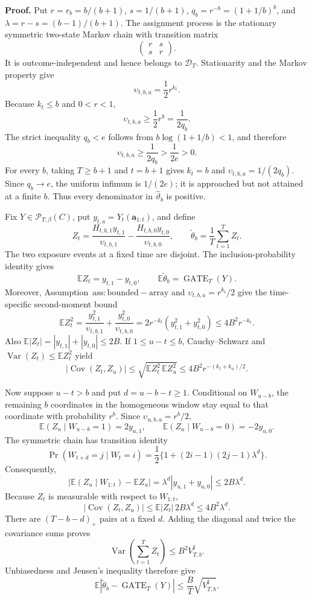 \textbf{Proof.} Put \(r=r_b=b/(b+1)\), \(s=1/(b+1)\), \(q_b=r^{-b}=(1+1/b)^b\), and \(\lambda=r-s=(b-1)/(b+1)\). The assignment process is the stationary symmetric two-state Markov chain with transition matrix
\[
\begin{pmatrix}r&s\\s&r\end{pmatrix}.
\]
It is outcome-independent and hence belongs to \(\mathcal D_T\). Stationarity and the Markov property give
\[
\upsilon_{t,b,a}=\frac12r^{k_t}.
\]
Because \(k_t\le b\) and \(0<r<1\),
\[
\upsilon_{t,b,a}\ge\frac12r^b=\frac{1}{2q_b}.
\]
The strict inequality \(q_b<e\) follows from \(b\log(1+1/b)<1\), and therefore
\[
\upsilon_{t,b,a}\ge\frac{1}{2q_b}>\frac{1}{2e}>0.
\]
For every \(b\), taking \(T\ge b+1\) and \(t=b+1\) gives \(k_t=b\) and \(\upsilon_{t,b,a}=1/(2q_b)\). Since \(q_b\to e\), the uniform infimum is \(1/(2e)\); it is approached but not attained at a finite \(b\). Thus every denominator in \(\widehat\vartheta_b\) is positive.

Fix \(Y\in\mathcal P_{T,\beta}(C)\), put \(y_{t,a}=Y_t(\mathbf a_{1:t})\), and define
\[
Z_t=\frac{H_{t,b,1}y_{t,1}}{\upsilon_{t,b,1}}-\frac{H_{t,b,0}y_{t,0}}{\upsilon_{t,b,0}},
\qquad
\widetilde\theta_b=\frac1T\sum_{t=1}^T Z_t.
\]
The two exposure events at a fixed time are disjoint. The inclusion-probability identity gives
\[
\mathbb E Z_t=y_{t,1}-y_{t,0},
\qquad
\mathbb E\widetilde\theta_b=\operatorname{GATE}_T(Y).
\]
Moreover, Assumption~\(\mathrm{ass:bounded-array}\) and \(\upsilon_{t,b,a}=r^{k_t}/2\) give the time-specific second-moment bound
\[
\mathbb E Z_t^2
=\frac{y_{t,1}^2}{\upsilon_{t,b,1}}+\frac{y_{t,0}^2}{\upsilon_{t,b,0}}
=2r^{-k_t}(y_{t,1}^2+y_{t,0}^2)
\le4B^2r^{-k_t}.
\]
Also \(\mathbb E|Z_t|=|y_{t,1}|+|y_{t,0}|\le2B\). If \(1\le u-t\le b\), Cauchy--Schwarz and \(\operatorname{Var}(Z_t)\le\mathbb E Z_t^2\) yield
\[
|\operatorname{Cov}(Z_t,Z_u)|
\le\sqrt{\mathbb E Z_t^2\,\mathbb E Z_u^2}
\le4B^2r^{-(k_t+k_u)/2}.
\]

Now suppose \(u-t>b\) and put \(d=u-b-t\ge1\). Conditional on \(W_{u-b}\), the remaining \(b\) coordinates in the homogeneous window stay equal to that coordinate with probability \(r^b\). Since \(\upsilon_{u,b,a}=r^b/2\),
\[
\mathbb E(Z_u\mid W_{u-b}=1)=2y_{u,1},
\qquad
\mathbb E(Z_u\mid W_{u-b}=0)=-2y_{u,0}.
\]
The symmetric chain has transition identity
\[
\Pr(W_{t+d}=j\mid W_t=i)
=\frac12\{1+(2i-1)(2j-1)\lambda^d\}.
\]
Consequently,
\[
\left|\mathbb E(Z_u\mid W_{1:t})-\mathbb EZ_u\right|
=\lambda^d|y_{u,1}+y_{u,0}|
\le2B\lambda^d.
\]
Because \(Z_t\) is measurable with respect to \(W_{1:t}\),
\[
|\operatorname{Cov}(Z_t,Z_u)|
\le \mathbb E|Z_t|\,2B\lambda^d
\le4B^2\lambda^d.
\]
There are \((T-b-d)_+\) pairs at a fixed \(d\). Adding the diagonal and twice the covariance sums proves
\[
\operatorname{Var}\left(\sum_{t=1}^T Z_t\right)
\le B^2V_{T,b}^{\sharp}.
\]
Unbiasedness and Jensen's inequality therefore give
\[
\mathbb E\left|\widetilde\theta_b-\operatorname{GATE}_T(Y)\right|
\le\frac BT\sqrt{V_{T,b}^{\sharp}}.
\]

